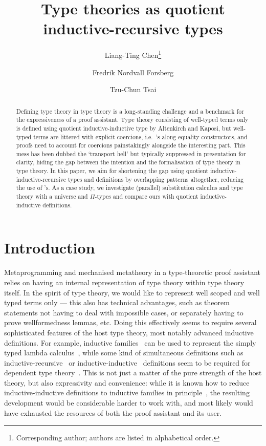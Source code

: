 \documentclass[a4paper,UKenglish,numberwithinsect,cleveref,thm-restate]{lipics-v2021}
\title{Type theories as quotient inductive-recursive types}
\author{Liang-Ting Chen\footnote{Corresponding author; authors are listed in alphabetical order.}}{Institute of Information Science, Academia Sinica, Taiwan \and \url{http://l-tchen.github.io}}{ltchen@iis.sinica.edu.tw}{https://orcid.org/0000-0002-3250-1331}{Supported by the National Science and Technology Council of Taiwan under grant NSTC 114-2222-E-001-001-MY3.}
\author{Fredrik Nordvall Forsberg}{Department of Computer and Information Sciences, University of Strathclyde, UK \and \url{https://fredriknf.com}}{fredrik.nordvall-forsberg@strath.ac.uk}{https://orcid.org/0000-0001-6157-9288}{Supported by the Engineering and Physical Sciences Research Council [EP/Y000455/1].}
\author{Tzu-Chun Tsai}{Institute of Information Science, Academia Sinica, Taiwan}{gene0905@icloud.com}{}{Supported by the National Science and Technology Council of Taiwan under grant NSTC 112-2221-E-001-003-MY3.}
\newcommand{\LT}[2][]{\todo[inline,author={L-T},caption={},#1]{#2}}
\begin{document}
\maketitle

\begin{abstract}
  \LT[noinline]{Try to interest Thorsten Altenkirch in the abstract}
  Defining type theory in type theory is a long-standing challenge and a benchmark for the expressiveness of a proof assistant.
  Type theory consisting of well-typed terms only is defined using quotient inductive-inductive type by Altenkirch and Kaposi, but well-typed terms are littered with explicit coercions, i.e.\ \transp's along equality constructors, and proofs need to account for coercions painstakingly alongside the interesting part.
  This mess has been dubbed the `transport hell' but typically suppressed in presentation for clarity, hiding the gap between the intention and the formalisation of type theory in type theory.
  In this paper, we aim for shortening the gap using quotient inductive-inductive-recursive types and definitions by overlapping patterns altogether, reducing the use of \transp's.
  As a case study, we investigate (parallel) substitution calculus and type theory with a universe and $\Pi$-types and compare ours with quotient inductive-inductive definitions.
\end{abstract}

\section{Introduction} \label{sec:intro}

Metaprogramming and mechanised metatheory in a type-theoretic proof assistant relies on having an internal representation of type theory within type theory itself.
%
In the spirit of type theory, we would like to represent well scoped and well typed terms only --- this also has technical advantages, such as theorem statements not having to deal with impossible cases, or separately having to prove wellformedness lemmas, etc.
%
Doing this effectively seems to require several sophisticated features of the host type theory, most notably advanced inductive definitions.
%
For example, inductive families~\cite{Dybjer1994} can be used to represent the simply typed lambda calculus~\cite{Altenkirch1999}, while some kind of simultaneous definitions such as inductive-recursive~\cite{Dybjer2000} or inductive-inductive~\cite{Nordvall-Forsberg2014} definitions seem to be required for dependent type theory~\cite{Danielsson2006,Chapman2009}.
%
This is not just a matter of the pure strength of the host theory, but also expressivity and convenience: while it is known how to reduce inductive-inductive definitions to inductive families in principle~\cite{Kaposi2020a}, the resulting development would be considerable harder to work with, and most likely would have exhausted the resources of both the proof assistant and its user.
\end{document}
